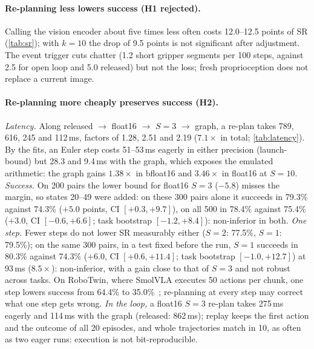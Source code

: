 \paragraph{Re-planning less lowers success (H1 rejected).}
Calling the vision encoder about five times less often costs 12.0--12.5 points of SR (\cref{tab:sr}); with $k{=}10$ the drop of 9.5 points is not significant after adjustment.
The event trigger cuts chatter (1.2 short gripper segments per 100 steps, against 2.5 for open loop and 5.0 released) but not the loss; fresh proprioception does not replace a current image.

\paragraph{Re-planning more cheaply preserves success (H2).}
\emph{Latency.} Along released $\to$ float16 $\to$ $S{=}3$ $\to$ graph, a re-plan takes 789, 616, 245 and 112\,ms, factors of 1.28, 2.51 and 2.19 ($7.1\times$ in total; \cref{tab:latency}).
By the fits, an Euler step costs 51--53\,ms eagerly in either precision (launch-bound) but 28.3 and 9.4\,ms with the graph, which exposes the emulated arithmetic: the graph gains $1.38\times$ in bfloat16 and $3.46\times$ in float16 at $S{=}10$.
\emph{Success.} On 200 pairs the lower bound for float16 $S{=}3$ ($-5.8$) misses the margin, so states 20--49 were added: on these 300 pairs alone it succeeds in 79.3\% against 74.3\% ($+5.0$ points, CI $[+0.3, +9.7]$), on all 500 in 78.4\% against 75.4\% ($+3.0$, CI $[-0.6, +6.6]$; task bootstrap $[-1.2, +8.4]$): non-inferior in both.
\emph{One step.} Fewer steps do not lower SR measurably either ($S{=}2$: 77.5\%, $S{=}1$: 79.5\%); on the same 300 pairs, in a test fixed before the run, $S{=}1$ succeeds in 80.3\% against 74.3\% ($+6.0$, CI $[+0.6, +11.4]$; task bootstrap $[-1.0, +12.7]$) at 93\,ms ($8.5\times$): non-inferior, with a gain close to that of $S{=}3$ and not robust across tasks.
On RoboTwin, where SmolVLA executes 50 actions per chunk, one step lowers success from 64.4\% to 35.0\%~\cite{tang2026fewer}; re-planning at every step may correct what one step gets wrong.
\emph{In the loop,} a float16 $S{=}3$ re-plan takes 275\,ms eagerly and 114\,ms with the graph (released: 862\,ms); replay keeps the first action and the outcome of all 20 episodes, and whole trajectories match in 10, as often as two eager runs: execution is not bit-reproducible.

